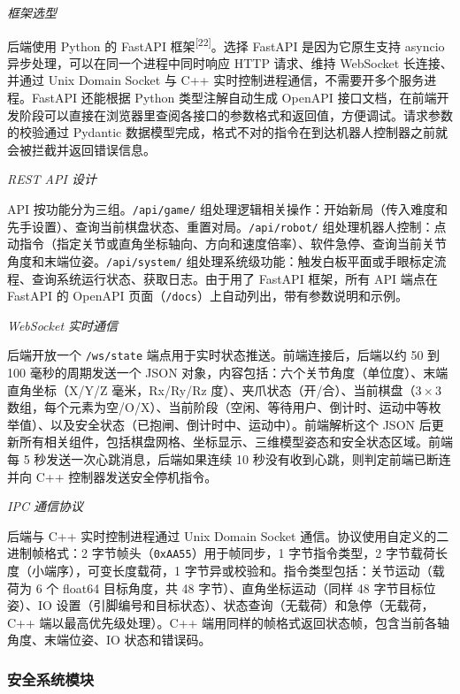 \documentclass[a4paper, 12pt, oneside]{ctexart}
\newcommand{\supercite}[1]{\textsuperscript{[#1]}}
\begin{document}
\noindent\textit{框架选型}

后端使用 Python 的 FastAPI 框架\supercite{22}。选择 FastAPI 是因为它原生支持 asyncio 异步处理，可以在同一个进程中同时响应 HTTP 请求、维持 WebSocket 长连接、并通过 Unix Domain Socket 与 C++ 实时控制进程通信，不需要开多个服务进程。FastAPI 还能根据 Python 类型注解自动生成 OpenAPI 接口文档，在前端开发阶段可以直接在浏览器里查阅各接口的参数格式和返回值，方便调试。请求参数的校验通过 Pydantic 数据模型完成，格式不对的指令在到达机器人控制器之前就会被拦截并返回错误信息。

\noindent\textit{REST API 设计}

API 按功能分为三组。\texttt{/api/game/} 组处理逻辑相关操作：开始新局（传入难度和先手设置）、查询当前棋盘状态、重置对局。\texttt{/api/robot/} 组处理机器人控制：点动指令（指定关节或直角坐标轴向、方向和速度倍率）、软件急停、查询当前关节角度和末端位姿。\texttt{/api/system/} 组处理系统级功能：触发白板平面或手眼标定流程、查询系统运行状态、获取日志。由于用了 FastAPI 框架，所有 API 端点在 FastAPI 的 OpenAPI 页面（\texttt{/docs}）上自动列出，带有参数说明和示例。

\noindent\textit{WebSocket 实时通信}

后端开放一个 \texttt{/ws/state} 端点用于实时状态推送。前端连接后，后端以约 50 到 100 毫秒的周期发送一个 JSON 对象，内容包括：六个关节角度（单位度）、末端直角坐标（X/Y/Z 毫米，Rx/Ry/Rz 度）、夹爪状态（开/合）、当前棋盘（$3\times3$ 数组，每个元素为空/O/X）、当前阶段（空闲、等待用户、倒计时、运动中等枚举值）、以及安全状态（已抱闸、倒计时中、运动中）。前端解析这个 JSON 后更新所有相关组件，包括棋盘网格、坐标显示、三维模型姿态和安全状态区域。前端每 5 秒发送一次心跳消息，后端如果连续 10 秒没有收到心跳，则判定前端已断连并向 C++ 控制器发送安全停机指令。

\noindent\textit{IPC 通信协议}

后端与 C++ 实时控制进程通过 Unix Domain Socket 通信。协议使用自定义的二进制帧格式：2 字节帧头（\texttt{0xAA55}）用于帧同步，1 字节指令类型，2 字节载荷长度（小端序），可变长度载荷，1 字节异或校验和。指令类型包括：关节运动（载荷为 6 个 float64 目标角度，共 48 字节）、直角坐标运动（同样 48 字节目标位姿）、IO 设置（引脚编号和目标状态）、状态查询（无载荷）和急停（无载荷，C++ 端以最高优先级处理）。C++ 端用同样的帧格式返回状态帧，包含当前各轴角度、末端位姿、IO 状态和错误码。

\subsubsection*{安全系统模块}
\end{document}
